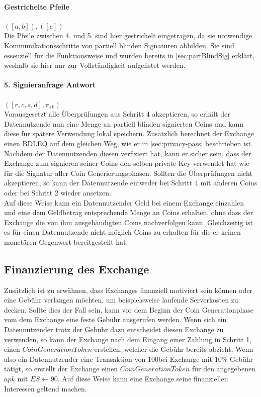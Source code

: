 \documentclass{scrreprt}
\begin{document}
\paragraph*{Gestrichelte Pfeile} $([a,b]), ([e])$\\
Die Pfeile zwischen 4. und 5. sind hier gestrichelt eingetragen, da sie notwendige Kommunikationsschritte von partiell blinden Signaturen abbilden. Sie sind essenziell für die Funktionsweise und wurden bereits in \ref{sec:partBlindSig} erklärt, weshalb sie hier nur zur Vollständigkeit aufgelistet werden.

\paragraph{5. Signieranfrage Antwort} $([r,c,s,d], \pi_{sk})$ \\
Vorausgesetzt alle Überprüfungen aus Schritt 4 akzeptieren, so erhält der Datennutzende nun eine Menge an partiell blinden signierten Coins und kann diese für spätere Verwendung lokal speichern. Zusätzlich berechnet der Exchange einen BDLEQ auf dem gleichen Weg, wie er in \ref{sec:privacy-pass} beschrieben ist. Nachdem der  Datennutzenden diesen verfiziert hat, kann er sicher sein, dass der Exchange zum signieren seiner Coins den selben private Key verwendet hat wie für die Signatur aller Coin Generierungsphasen. Sollten die Überprüfungen nicht akzeptieren, so kann der Datennutzende entweder bei Schritt 4 mit anderen Coins oder bei Schritt 2 wieder ansetzen.\\

Auf diese Weise kann ein Datennutzender Geld bei einem Exchange einzahlen und eine dem Geldbetrag entsprechende Menge an Coins erhalten, ohne dass der Exchange die von ihm ausgehändigten Coins nachverfolgen kann. Gleichzeitig ist es für einen Datennutzende nicht möglich Coins zu erhalten für die er keinen monetären Gegenwert bereitgestellt hat.
\subsection{Finanzierung des Exchange}
Zusätzlich ist zu erwähnen, dass Exchanges finanziell motiviert sein können oder eine Gebühr verlangen möchten, um beispielsweise laufende Serverkosten zu decken. Sollte dies der Fall sein, kann vor dem Beginn der Coin Generationphase vom dem Exchange eine feste Gebühr ausgerufen werden. Wenn sich ein Datennutzender trotz der Gebühr dazu entscheidet diesen Exchange zu verwenden, so kann der Exchange nach dem Eingang einer Zahlung in Schritt 1, einen $CoinGenerationToken$ erstellen, welcher die Gebühr bereits abzieht. Wenn also ein Datennutzender eine Transaktion von $100$\texteuro  bei Exchange mit $10\%$ Gebühr tätigt, so erstellt der Exchange einen $CoinGenerationToken$ für den angegebenen $apk$ mit $ES \leftarrow 90$\texteuro. Auf diese Weise kann eine Exchange seine finanziellen Interessen geltend machen. 
\end{document}
